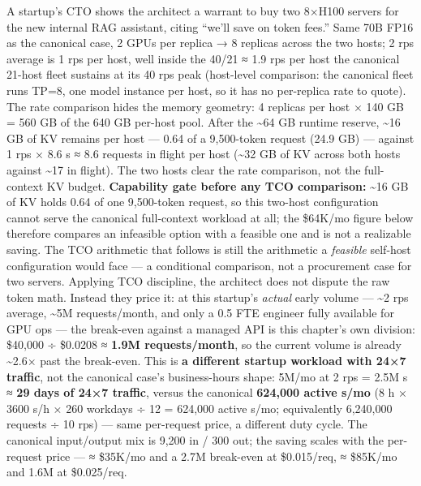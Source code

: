 A startup's CTO shows the architect a warrant to buy two 8×H100 servers
for the new internal RAG assistant, citing ``we'll save on token fees.''
Same 70B FP16 as the canonical case, 2 GPUs per replica → 8 replicas
across the two hosts; 2 rps average is 1 rps per host, well inside the
40/21 ≈ 1.9 rps per host the canonical 21-host fleet sustains at its 40
rps peak (host-level comparison: the canonical fleet runs TP=8, one
model instance per host, so it has no per-replica rate to quote). The
rate comparison hides the memory geometry: 4 replicas per host × 140 GB
= 560 GB of the 640 GB per-host pool. After the \textasciitilde64 GB
runtime reserve, \textasciitilde16 GB of KV remains per host --- 0.64 of
a 9,500-token request (24.9 GB) --- against 1 rps × 8.6 s ≈ 8.6 requests
in flight per host (\textasciitilde32 GB of KV across both hosts against
\textasciitilde17 in flight). The two hosts clear the rate comparison,
not the full-context KV budget. \textbf{Capability gate before any TCO
comparison:} \textasciitilde16 GB of KV holds 0.64 of one 9,500-token
request, so this two-host configuration cannot serve the canonical
full-context workload at all; the \$64K/mo figure below therefore
compares an infeasible option with a feasible one and is not a
realizable saving. The TCO arithmetic that follows is still the
arithmetic a \emph{feasible} self-host configuration would face --- a
conditional comparison, not a procurement case for two servers. Applying
TCO discipline, the architect does not dispute the raw token math.
Instead they price it: at this startup's \emph{actual} early volume ---
\textasciitilde2 rps average, \textasciitilde5M requests/month, and only
a 0.5 FTE engineer fully available for GPU ops --- the break-even
against a managed API is this chapter's own division: \$40,000 ÷
\$0.0208 ≈ \textbf{1.9M requests/month}, so the current volume is
already \textasciitilde2.6× past the break-even. This is \textbf{a
different startup workload with 24×7 traffic}, not the canonical case's
business-hours shape: 5M/mo at 2 rps = 2.5M s ≈ \textbf{29 days of 24×7
traffic}, versus the canonical \textbf{624,000 active s/mo} (8 h × 3600
s/h × 260 workdays ÷ 12 = 624,000 active s/mo; equivalently 6,240,000
requests ÷ 10 rps) --- same per-request price, a different duty cycle.
The canonical input/output mix is 9,200 in / 300 out; the saving scales
with the per-request price --- ≈ \$35K/mo and a 2.7M break-even at
\$0.015/req, ≈ \$85K/mo and 1.6M at \$0.025/req.

